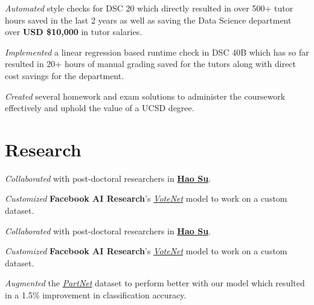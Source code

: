 \documentclass[]{deedy-resume-openfont}
\begin{document}
\begin{minipage}[t]{0.66\textwidth}
\vspace{\topsep} %
\begin{tightemize}
\item \emph{Automated} style checks for DSC 20 which directly resulted in over 500+ tutor hours saved in the last 2 years as well as saving the Data Science department over \textbf{USD \$10,000} in tutor salaries.
\item \emph{Implemented} a linear regression based runtime check in DSC 40B which has so far resulted in 20+ hours of manual grading saved for the tutors along with direct cost savings for the department.
\item \emph{Created} several homework and exam solutions to administer the coursework effectively and uphold the value of a UCSD degree.
\end{tightemize}
\sectionsep

\section{Research}
\begin{tightemize}
\item \emph{Collaborated} with post-doctoral researchers in \textbf{\href{https://scholar.google.com/citations?user=1P8Zu04AAAAJ}{Hao Su}}.
\item \emph{Customized} \textbf{Facebook AI Research}'s \emph{\href{https://arxiv.org/abs/1904.09664}{VoteNet}} model to work on a custom dataset.
\end{tightemize}
\sectionsep

\begin{tightemize}
\item \emph{Collaborated} with post-doctoral researchers in \textbf{\href{https://scholar.google.com/citations?user=1P8Zu04AAAAJ}{Hao Su}}.
\item \emph{Customized} \textbf{Facebook AI Research}'s \emph{\href{https://arxiv.org/abs/1904.09664}{VoteNet}} model to work on a custom dataset.
\item \emph{Augmented} the \emph{\href{https://cs.stanford.edu/~kaichun/partnet/}{PartNet}} dataset to perform better with our model which resulted in a 1.5\% improvement in classification accuracy.
\end{tightemize}
\sectionsep


\end{minipage}
\end{document}
